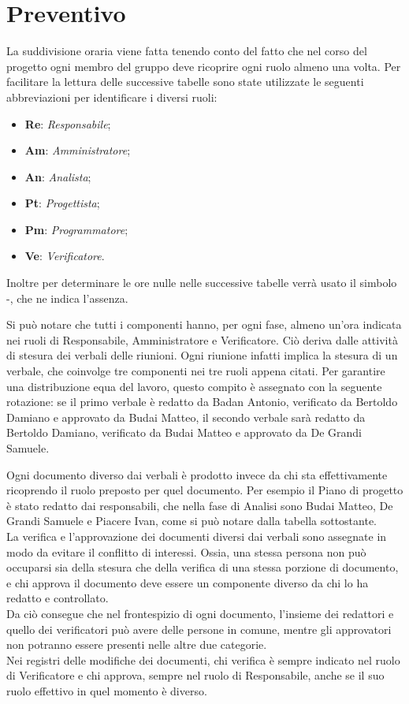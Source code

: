 \section{Preventivo}
La suddivisione oraria viene fatta tenendo conto del fatto che nel corso del progetto ogni  membro del gruppo deve ricoprire ogni ruolo almeno una volta.
Per facilitare la lettura delle successive tabelle sono state utilizzate le seguenti abbreviazioni per identificare i diversi ruoli:
\begin{itemize}
	\item \textbf{Re}: \textit{Responsabile};
	\item \textbf{Am}: \textit{Amministratore};
	\item \textbf{An}: \textit{Analista};
	\item \textbf{Pt}: \textit{Progettista};
	\item \textbf{Pm}: \textit{Programmatore};
	\item \textbf{Ve}: \textit{Verificatore}.
\end{itemize}
Inoltre per determinare le ore nulle nelle successive tabelle verrà usato il simbolo -, che ne indica l'assenza.

Si può notare che tutti i componenti hanno, per ogni fase, almeno un'ora indicata nei ruoli di Responsabile, Amministratore e Verificatore. Ciò deriva dalle attività di stesura dei verbali delle riunioni. Ogni riunione infatti implica la stesura di un verbale, che coinvolge tre componenti nei tre ruoli appena citati. Per garantire una distribuzione equa del lavoro, questo compito è assegnato con la seguente rotazione: se il primo verbale è redatto da Badan Antonio, verificato da Bertoldo Damiano e approvato da Budai Matteo, il secondo verbale sarà redatto da Bertoldo Damiano, verificato da Budai Matteo e approvato da De Grandi Samuele.

Ogni documento diverso dai verbali è prodotto invece da chi sta effettivamente ricoprendo il ruolo preposto per quel documento. Per esempio il Piano di progetto è stato redatto dai responsabili, che nella fase di Analisi sono Budai Matteo, De Grandi Samuele e Piacere Ivan, come si può notare dalla tabella sottostante. \\
La verifica e l'approvazione dei documenti diversi dai verbali sono assegnate in modo da evitare il conflitto di interessi. Ossia, una stessa persona non può occuparsi sia della stesura che della verifica di una stessa porzione di documento, e chi approva il documento deve essere un componente diverso da chi lo ha redatto e controllato. \\
Da ciò consegue che nel frontespizio di ogni documento, l'insieme dei redattori e quello dei verificatori può avere delle persone in comune, mentre gli approvatori non potranno essere presenti nelle altre due categorie. \\
Nei registri delle modifiche dei documenti, chi verifica è sempre indicato nel ruolo di Verificatore e chi approva, sempre nel ruolo di Responsabile, anche se il suo ruolo effettivo in quel momento è diverso. \\


